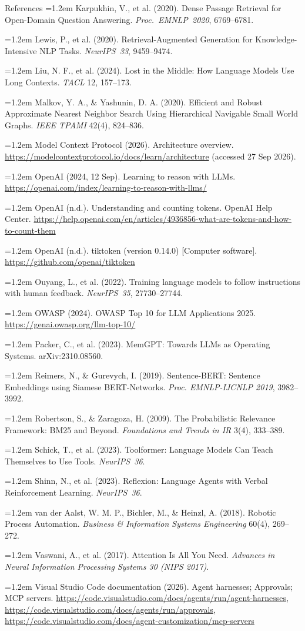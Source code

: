 \documentclass[aspectratio=169,11pt]{beamer}
\newcommand{\refitem}[1]{\hangindent=1.2em\hangafter=1 #1\par}
\begin{document}
\begin{frame}[allowframebreaks]{References}
  \refitem{Karpukhin, V., et al. (2020). Dense Passage Retrieval for Open-Domain Question Answering. \textit{Proc.~EMNLP~2020}, 6769--6781.}
  \refitem{Lewis, P., et al. (2020). Retrieval-Augmented Generation for Knowledge-Intensive NLP Tasks. \textit{NeurIPS~33}, 9459--9474.}
  \refitem{Liu, N. F., et al. (2024). Lost in the Middle: How Language Models Use Long Contexts. \textit{TACL} 12, 157--173.}
  \refitem{Malkov, Y. A., \& Yashunin, D. A. (2020). Efficient and Robust Approximate Nearest Neighbor Search Using Hierarchical Navigable Small World Graphs. \textit{IEEE TPAMI} 42(4), 824--836.}
  \refitem{Model Context Protocol (2026). Architecture overview. \url{https://modelcontextprotocol.io/docs/learn/architecture} (accessed 27 Sep 2026).}
  \refitem{OpenAI (2024, 12 Sep). Learning to reason with LLMs. \url{https://openai.com/index/learning-to-reason-with-llms/}}
  \refitem{OpenAI (n.d.). Understanding and counting tokens. OpenAI Help Center. \url{https://help.openai.com/en/articles/4936856-what-are-tokens-and-how-to-count-them}}
  \refitem{OpenAI (n.d.). tiktoken (version 0.14.0) [Computer software]. \url{https://github.com/openai/tiktoken}}
  \refitem{Ouyang, L., et al. (2022). Training language models to follow instructions with human feedback. \textit{NeurIPS~35}, 27730--27744.}
  \refitem{OWASP (2024). OWASP Top 10 for LLM Applications 2025. \url{https://genai.owasp.org/llm-top-10/}}
  \refitem{Packer, C., et al. (2023). MemGPT: Towards LLMs as Operating Systems. arXiv:2310.08560.}
  \refitem{Reimers, N., \& Gurevych, I. (2019). Sentence-BERT: Sentence Embeddings using Siamese BERT-Networks. \textit{Proc. EMNLP-IJCNLP 2019}, 3982--3992.}
  \refitem{Robertson, S., \& Zaragoza, H. (2009). The Probabilistic Relevance Framework: BM25 and Beyond. \textit{Foundations and Trends in IR} 3(4), 333--389.}
  \refitem{Schick, T., et al. (2023). Toolformer: Language Models Can Teach Themselves to Use Tools. \textit{NeurIPS~36}.}
  \refitem{Shinn, N., et al. (2023). Reflexion: Language Agents with Verbal Reinforcement Learning. \textit{NeurIPS~36}.}
  \refitem{van der Aalst, W. M. P., Bichler, M., \& Heinzl, A. (2018). Robotic Process Automation. \textit{Business \& Information Systems Engineering} 60(4), 269--272.}
  \refitem{Vaswani, A., et al. (2017). Attention Is All You Need. \textit{Advances in Neural Information Processing Systems 30 (NIPS 2017)}.}
  \refitem{Visual Studio Code documentation (2026). Agent harnesses; Approvals; MCP servers. \url{https://code.visualstudio.com/docs/agents/run/agent-harnesses}, \url{https://code.visualstudio.com/docs/agents/run/approvals}, \url{https://code.visualstudio.com/docs/agent-customization/mcp-servers}}

\end{frame}
\end{document}
